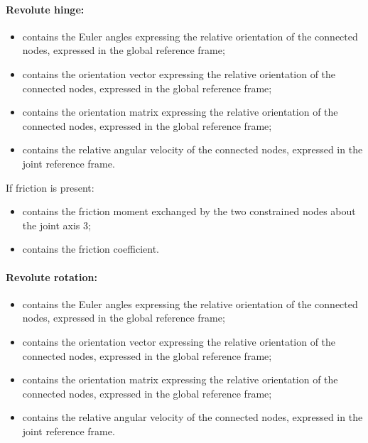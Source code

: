 \paragraph{Revolute hinge:}
\begin{itemize}
\item {} contains the Euler angles 
  expressing the relative orientation of the connected nodes, expressed in 
  the global reference frame;
\item {} contains the orientation vector
  expressing the relative orientation of the connected nodes, expressed in 
  the global reference frame;
\item {} contains the orientation matrix
  expressing the relative orientation of the connected nodes, expressed in 
  the global  reference frame;
\item {} contains the relative angular
  velocity of the connected nodes, expressed in the joint reference frame.
\end{itemize}

If friction is present:
\begin{itemize}
\item {} contains the friction moment
  exchanged by the two constrained nodes about the joint axis 3;
\item {} contains the friction coefficient.
\end{itemize}

\paragraph{Revolute rotation:}
\begin{itemize}
\item {} contains the Euler angles 
  expressing the relative orientation of the connected nodes, expressed in 
  the global reference frame;
\item {} contains the orientation vector
  expressing the relative orientation of the connected nodes, expressed in 
  the global reference frame;
\item {} contains the orientation matrix
  expressing the relative orientation of the connected nodes, expressed in 
  the global reference frame;
\item {} contains the relative angular
  velocity of the connected nodes, expressed in the joint reference frame.
\end{itemize}

